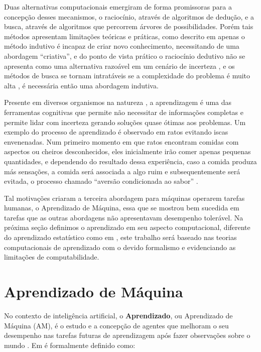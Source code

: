 Duas alternativas computacionais emergiram de forma promissoras para a
concepção desses mecanismos, o raciocínio, através de algoritmos de dedução, e
a busca, através de algoritmos que percorrem árvores de possibilidades. Porém
tais métodos apresentam limitações teóricas e práticas, como descrito em
\cite{popper2005logic} apenas o método indutivo é incapaz de criar novo
conhecimento, necessitando de uma abordagem ``criativa'', e do ponto de vista
prático o raciocínio dedutivo não se apresenta como uma alternativa razoável em
um cenário de incerteza \cite{russell2016artificial}, e os métodos de busca se
tornam intratáveis se a complexidade do problema é muito alta
\cite{openai2019dota,Silver2016}, é necessária então uma abordagem indutiva.

Presente em diversos organismos na natureza \cite{shettleworth2001animal}, a
aprendizagem é uma das ferramentas cognitivas que permite não necessitar de
informações completas e permite lidar com incerteza gerando soluções quase
ótimas aos problemas. Um exemplo do processo de aprendizado é observado em
ratos evitando iscas envenenadas. Num primeiro momento em que ratos encontram
comidas com aspectos ou cheiros desconhecidos, eles inicialmente irão comer
apenas pequenas quantidades, e dependendo do resultado dessa experiência, caso
a comida produza más sensações, a comida será associada a algo ruim e
subsequentemente será evitada, o processo chamado ``aversão condicionada ao
sabor'' \cite{garcia1955conditioned}.

Tal motivações criaram a terceira abordagem para máquinas operarem tarefas
humanas, o Aprendizado de Máquina, essa que se mostrou bem sucedida em tarefas
que as outras abordagens não apresentavam desempenho tolerável. Na próxima
seção definimos o aprendizado em seu aspecto computacional, diferente do
aprendizado estatístico como em \cite{friedman2001elements}, este trabalho será
baseado nas teorias computacionais de aprendizado
\cite{valiant1984theory,bartlett2002rademacher,gold1967language}
com o devido formalismo e evidenciando as limitações de computabilidade.

\section{Aprendizado de Máquina}
\label{sec:aprendizado-de-maquina}

No contexto de inteligência artificial, o \textbf{Aprendizado}, ou Aprendizado
de Máquina (AM), é o estudo e a concepção de agentes que melhoram o seu
desempenho nas tarefas futuras de aprendizagem após fazer observações sobre o
mundo \cite{russell2016artificial, mohri2018foundations}. Em
\cite{mitchell1997machine} é formalmente definido como:

